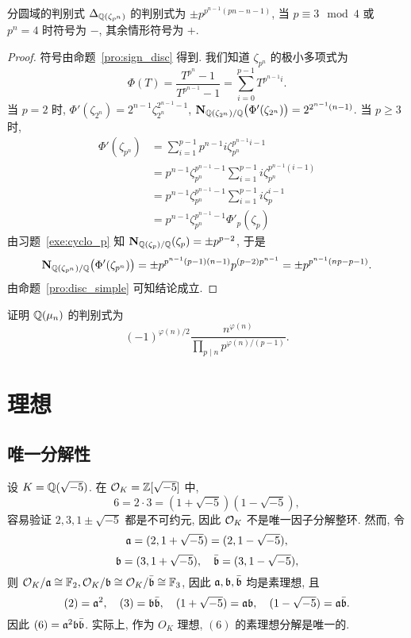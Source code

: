 \begin{proposition}{分圆域的判别式}{}
$\Delta_{{\mathbb{Q}}(\zeta_{p^n})}$ 的判别式为 $\pm p^{p^{n-1}(pn-n-1)}$, 当 $p\equiv 3\mod 4$ 或 $p^n=4$ 时符号为 $-$, 其余情形符号为 $+$.
\end{proposition}
\begin{proof}
符号由命题~\ref{pro:sign_disc} 得到. 我们知道 $\zeta_{p^n}$ 的极小多项式为
  \[\Phi(T)=\frac{T^{p^n}-1}{T^{p^{n-1}}-1}=\sum_{i=0}^{p-1} T^{p^{n-1}i}.\]
当 $p=2$ 时, $\Phi'(\zeta_{2^n})=2^{n-1}\zeta_{2^n}^{2^{n-1}-1}$, ${\mathbf{N}}_{{\mathbb{Q}}(\zeta_{2^n})/{\mathbb{Q}}}\bigl(\Phi'(\zeta_{2^n})\bigr)=2^{2^{n-1}(n-1)}$. 当 $p\ge 3$ 时, 
  \[\begin{split}
    \Phi'(\zeta_{p^n})&=\sum_{i=1}^{p-1}p^{n-1}i\zeta_{p^n}^{p^{n-1}i-1}\\
     &=p^{n-1}\zeta_{p^n}^{p^{n-1}-1}\sum_{i=1}^{p-1}i\zeta_{p^n}^{p^{n-1}(i-1)}\\
     &=p^{n-1}\zeta_{p^n}^{p^{n-1}-1}\sum_{i=1}^{p-1}i\zeta_{p}^{i-1}\\
     &=p^{n-1}\zeta_{p^n}^{p^{n-1}-1}\Phi'_p(\zeta_p)
  \end{split}\]
由习题~\ref{exe:cyclo_p} 知 ${\mathbf{N}}_{{\mathbb{Q}}(\zeta_p)/{\mathbb{Q}}}(\zeta_p)=\pm p^{p-2}$, 于是
  \[{\mathbf{N}}_{{\mathbb{Q}}(\zeta_{p^n})/{\mathbb{Q}}}\bigl(\Phi'(\zeta_{p^n})\bigr)=\pm p^{p^{n-1}(p-1)(n-1)} p^{(p-2)p^{n-1}}=\pm p^{p^{n-1}(np-p-1)}.\]
由命题~\ref{pro:disc_simple} 可知结论成立.
\end{proof}

\begin{exercise}
证明 ${\mathbb{Q}}(\mu_n)$ 的判别式为
	\[(-1)^{\varphi(n)/2}\frac{n^{\varphi(n)}}{\prod_{p\mid n}p^{\varphi(n)/(p-1)}}.\]
\end{exercise}



\section{理想}

\subsection{唯一分解性}
\begin{example}
设 $K={\mathbb{Q}}(\sqrt{-5})$. 在 ${\mathcal{O}}_K={\mathbb{Z}}[\sqrt{-5}]$ 中,
  \[6=2\cdot 3=(1+\sqrt{-5})(1-\sqrt{-5}),\]
容易验证 $2,3,1\pm\sqrt{-5}$ 都是不可约元, 因此 ${\mathcal{O}}_K$ 不是唯一因子分解整环. 然而, 令 
  \[{\mathfrak{a}}=(2,1+\sqrt{-5})=(2,1-\sqrt{-5}), \]
  \[{\mathfrak{b}}=(3,1+\sqrt{-5}),\quad \bar {{\mathfrak{b}}}=(3,1-\sqrt{-5}),\]
则 ${\mathcal{O}}_K/{\mathfrak{a}}\cong {\mathbb{F}}_2,{\mathcal{O}}_K/{\mathfrak{b}}\cong {\mathcal{O}}_K/\bar {{\mathfrak{b}}}\cong {\mathbb{F}}_3$, 因此 ${\mathfrak{a}},{\mathfrak{b}},\bar {{\mathfrak{b}}}$ 均是素理想, 且
  \[(2)={\mathfrak{a}}^2,\quad (3)={\mathfrak{b}}\bar {{\mathfrak{b}}},\quad (1+\sqrt{-5})={\mathfrak{a}}{\mathfrak{b}},\quad (1-\sqrt{-5})={\mathfrak{a}}\bar{{\mathfrak{b}}}.\]
因此 $(6)={\mathfrak{a}}^2 {\mathfrak{b}}\bar{{\mathfrak{b}}}$. 实际上, 作为 $O_K$ 理想, $(6)$ 的素理想分解是唯一的.
\end{example}

